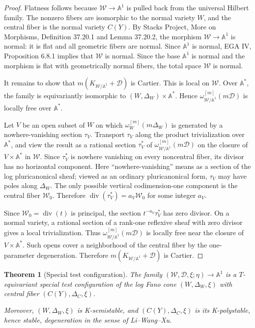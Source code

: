\documentclass[11pt]{amsart}
\newtheorem{theorem}{Theorem}[section]
\theoremstyle{definition}
\theoremstyle{remark}
\begin{document}
\begin{proof}
Flatness follows because $\mathcal W\to\mathbb A^1$ is pulled back from the universal Hilbert family. The nonzero fibers are isomorphic to the normal variety $W$, and the central fiber is the normal variety $C(Y)$. By Stacks Project, More on Morphisms, Definition 37.20.1 and Lemma 37.20.2, the morphism $\mathcal W\to\mathbb A^1$ is normal: it is flat and all geometric fibers are normal. Since $\mathbb A^1$ is normal, EGA IV, Proposition 6.8.1 implies that $\mathcal W$ is normal. Since the base $\mathbb A^1$ is normal and the morphism is flat with geometrically normal fibers, the total space $\mathcal W$ is normal.

It remains to show that $m(K_{\mathcal W/\mathbb A^1}+\mathcal D)$ is Cartier. This is local on $\mathcal W$. Over $\mathbb A^*$, the family is equivariantly isomorphic to $(W,\Delta_W)\times\mathbb A^*$. Hence $\omega_{\mathcal W/\mathbb A^1}^{[m]}(m\mathcal D)$ is locally free over $\mathbb A^*$.

Let $V$ be an open subset of $W$ on which $\omega_W^{[m]}(m\Delta_W)$ is generated by a nowhere-vanishing section $\tau_V$. Transport $\tau_V$ along the product trivialization over $\mathbb A^*$, and view the result as a rational section $\tau_V^*$ of $\omega_{\mathcal W/\mathbb A^1}^{[m]}(m\mathcal D)$ on the closure of $V\times\mathbb A^*$ in $\mathcal W$. Since $\tau_V^*$ is nowhere vanishing on every noncentral fiber, its divisor has no horizontal component. Here “nowhere-vanishing” means as a section of the log pluricanonical sheaf; viewed as an ordinary pluricanonical form, $\tau_V$ may have poles along
$\Delta_W$. The only possible vertical codimension-one component is the central fiber $\mathcal W_0$. Therefore $\operatorname{div}(\tau_V^*)=a_V\mathcal W_0$ for some integer $a_V$.

Since $\mathcal W_0=\operatorname{div}(t)$ is principal, the section $t^{-a_V}\tau_V^*$ has zero divisor. On a normal variety, a rational section of a rank-one reflexive sheaf with zero divisor gives a local trivialization. Thus $\omega_{\mathcal W/\mathbb A^1}^{[m]}(m\mathcal D)$ is locally free near the closure of $V\times\mathbb A^*$. Such opens cover a neighborhood of the central fiber by the one-parameter degeneration. Therefore $m(K_{\mathcal W/\mathbb A^1}+\mathcal D)$ is Cartier.
\end{proof}

\begin{theorem}[Special test configuration]
The family $(\mathcal W,\mathcal D,\xi;\eta)\to\mathbb A^1$ is a
$T$-equivariant special test configuration of the log Fano cone
$(W,\Delta_W,\xi)$ with central fiber $(C(Y),\Delta_C,\xi)$.

Moreover, $(W,\Delta_W,\xi)$ is K-semistable, and
$(C(Y),\Delta_C,\xi)$ is its K-polystable, hence stable, degeneration in the
sense of Li--Wang--Xu.
\end{theorem}
\end{document}
